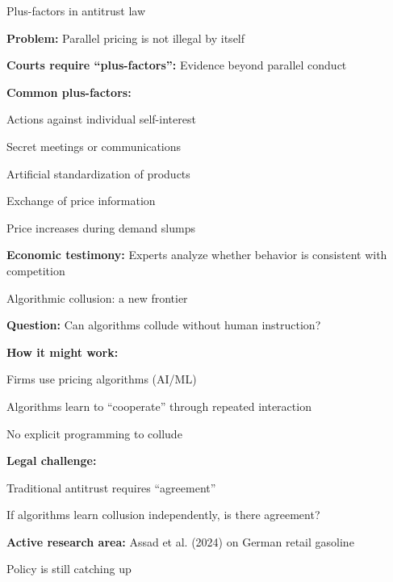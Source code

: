 \documentclass[notes,11pt, aspectratio=169]{beamer}
\newenvironment{wideitemize}{\itemize\addtolength{\itemsep}{10pt}}{\enditemize}
\begin{document}
\begin{frame}{Plus-factors in antitrust law}
	\begin{wideitemize}
		\item \textbf{Problem:} Parallel pricing is not illegal by itself
		\item \textbf{Courts require ``plus-factors'':} Evidence beyond parallel conduct
		\item \textbf{Common plus-factors:}
		\begin{wideitemize}
			\vspace{5pt}
			\item Actions against individual self-interest
			\item Secret meetings or communications
			\item Artificial standardization of products
			\item Exchange of price information
			\item Price increases during demand slumps
		\end{wideitemize}
		\item \textbf{Economic testimony:} Experts analyze whether behavior is consistent with competition
	\end{wideitemize}
\end{frame}

\begin{frame}{Algorithmic collusion: a new frontier}
	\begin{wideitemize}
		\item \textbf{Question:} Can algorithms collude without human instruction?
		\item \textbf{How it might work:}
		\begin{wideitemize}
			\vspace{5pt}
			\item Firms use pricing algorithms (AI/ML)
			\item Algorithms learn to ``cooperate'' through repeated interaction
			\item No explicit programming to collude
		\end{wideitemize}
		\item \textbf{Legal challenge:}
		\begin{wideitemize}
			\vspace{5pt}
			\item Traditional antitrust requires ``agreement''
			\item If algorithms learn collusion independently, is there agreement?
		\end{wideitemize}
		\item \textbf{Active research area:} Assad et al. (2024) on German retail gasoline
		\item Policy is still catching up
	\end{wideitemize}
\end{frame}
\end{document}
